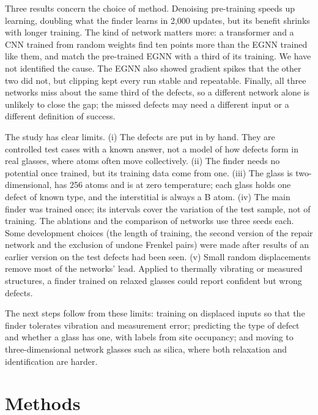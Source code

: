 \documentclass[11pt]{article}
\begin{document}
Three results concern the choice of method. Denoising pre-training speeds up learning, doubling what the finder learns in 2,000 updates, but its benefit shrinks with longer training. The kind of network matters more: a transformer and a CNN trained from random weights find ten points more than the EGNN trained like them, and match the pre-trained EGNN with a third of its training. We have not identified the cause. The EGNN also showed gradient spikes that the other two did not, but clipping kept every run stable and repeatable. Finally, all three networks miss about the same third of the defects, so a different network alone is unlikely to close the gap; the missed defects may need a different input or a different definition of success.

The study has clear limits. (i) The defects are put in by hand. They are controlled test cases with a known answer, not a model of how defects form in real glasses, where atoms often move collectively\citep{faupel2003}. (ii) The finder needs no potential once trained, but its training data come from one. (iii) The glass is two-dimensional, has 256 atoms and is at zero temperature; each glass holds one defect of known type, and the interstitial is always a B atom. (iv) The main finder was trained once; its intervals cover the variation of the test sample, not of training. The ablations and the comparison of networks use three seeds each. Some development choices (the length of training, the second version of the repair network and the exclusion of undone Frenkel pairs) were made after results of an earlier version on the test defects had been seen. (v) Small random displacements remove most of the networks' lead. Applied to thermally vibrating or measured structures, a finder trained on relaxed glasses could report confident but wrong defects.

The next steps follow from these limits: training on displaced inputs so that the finder tolerates vibration and measurement error; predicting the type of defect and whether a glass has one, with labels from site occupancy; and moving to three-dimensional network glasses such as silica, where both relaxation and identification are harder.

\section*{Methods}
\end{document}
